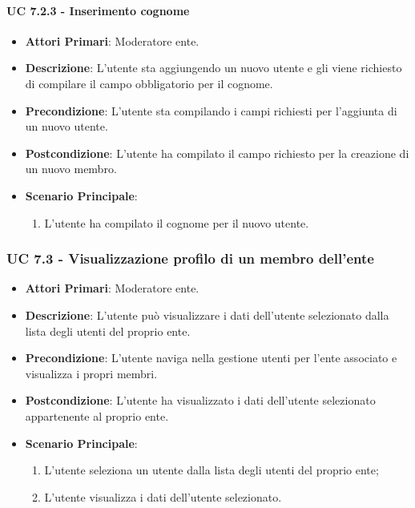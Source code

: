 			\paragraph{UC 7.2.3 - Inserimento cognome}
			\begin{itemize}
				\item \textbf{Attori Primari}: Moderatore ente.
				\item \textbf{Descrizione}: L'utente sta aggiungendo un nuovo utente e gli viene richiesto di compilare il campo obbligatorio per il cognome.
				\item \textbf{Precondizione}: L'utente sta compilando i campi richiesti per l'aggiunta di un nuovo utente.
				\item \textbf{Postcondizione}: L'utente ha compilato il campo richiesto per la creazione di un nuovo membro.
				\item \textbf{Scenario Principale}:
				\begin{enumerate}
					\item{L'utente ha compilato il cognome per il nuovo utente.}
				\end{enumerate}	
			\end{itemize}

			\subsubsection{UC 7.3 - Visualizzazione profilo di un membro dell'ente}
			\begin{itemize}
				\item \textbf{Attori Primari}: Moderatore ente.
				\item \textbf{Descrizione}: L'utente può visualizzare i dati dell'utente selezionato dalla lista degli utenti del proprio ente.
				\item \textbf{Precondizione}: L'utente naviga nella gestione utenti per l'ente associato e visualizza i propri membri.
				\item \textbf{Postcondizione}: L'utente ha visualizzato i dati dell'utente selezionato appartenente al proprio ente.
				\item \textbf{Scenario Principale}:
				\begin{enumerate}
					\item{L'utente seleziona un utente dalla lista degli utenti del proprio ente;}
					\item{L'utente visualizza i dati dell'utente selezionato.}
				\end{enumerate}
			\end{itemize}


